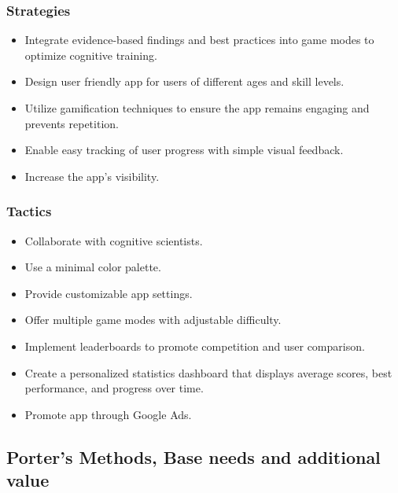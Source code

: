 \documentclass[]{VUMIFTemplateClass}
\begin{document}
\subsubsection{Strategies}
\begin{itemize}
    \item Integrate evidence-based findings and best practices into game modes to optimize cognitive training.
    \item Design user friendly app for users of different ages and skill levels.
    \item Utilize gamification techniques to ensure the app remains engaging and prevents repetition.
    \item Enable easy tracking of user progress with simple visual feedback.
    \item Increase the app's visibility.
\end{itemize}

\subsubsection{Tactics}
\begin{itemize} 
    \item Collaborate with cognitive scientists.
    \item Use a minimal color palette.
    \item Provide customizable app settings.
    \item Offer multiple game modes with adjustable difficulty.
    \item Implement leaderboards to promote competition and user comparison.
    \item Create a personalized statistics dashboard that displays average scores, best performance, and progress over time.
    \item Promote app through Google Ads.  
\end{itemize}

\subsection{Porter's Methods, Base needs and additional value}
\end{document}

